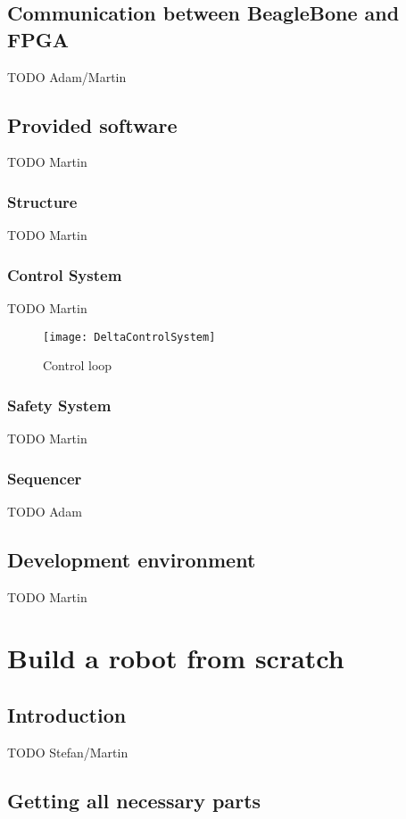 \section{Communication between BeagleBone and FPGA}
TODO Adam/Martin

\section{Provided software}
TODO Martin

\subsection{Structure}
TODO Martin

\subsection{Control System}
TODO Martin

\begin{figure}[htbp]
	\centering
	\texttt{[image: DeltaControlSystem]}
	\caption{Control loop}
	\label{fig:ControlLoop}
\end{figure}

\subsection{Safety System}
TODO Martin

\subsection{Sequencer}
TODO Adam

\section{Development environment}
TODO Martin

\chapter{Build a robot from scratch}

\section{Introduction}
TODO Stefan/Martin

\section{Getting all necessary parts}

